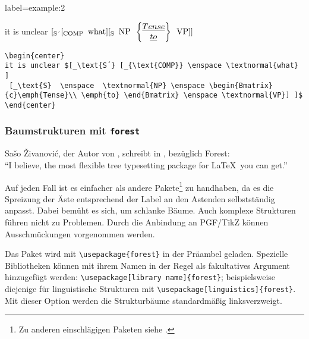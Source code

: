 \begin{lfgwprint}{label={example:2}}
\begin{center}
it is unclear $[_\text{S´} [_{\text{COMP}} \enspace \textnormal{what} ]
 [_\text{S}  \enspace  \textnormal{NP} \enspace \begin{Bmatrix} \emph{Tense}\\ \emph{to} \end{Bmatrix} \enspace \textnormal{VP}] ]$
\end{center}
\end{lfgwprint}

\lstset{frame=single}
\begin{lstlisting}
\begin{center}
it is unclear $[_\text{S´} [_{\text{COMP}} \enspace \textnormal{what} ]
 [_\text{S}  \enspace  \textnormal{NP} \enspace \begin{Bmatrix}{c}\emph{Tense}\\ \emph{to} \end{Bmatrix} \enspace \textnormal{VP}] ]$
\end{center}
\end{lstlisting}


\subsubsection{Baumstrukturen mit \texttt{forest}}

Sa\v{s}o \v{Z}ivanovi\'{c}, der Autor von , schreibt in
\cite[3]{zivanovic:forest},
bezüglich Forest: \\
"`I believe, the most flexible tree typesetting package for \LaTeX\ you can get."'

Auf jeden Fall ist es einfacher als andere Pakete\footnote{Zu anderen
einschlägigen Paketen siehe \cite{roemer:dtk2016}.} zu handhaben, da es die Spreizung
der Äste entsprechend der Label an den Astenden selbstständig anpasst. Dabei bemüht es sich,
um schlanke Bäume. Auch komplexe Strukturen führen nicht zu Problemen. Durch die Anbindung
an PGF/TikZ können Ausschmückungen vorgenommen werden.


Das Paket wird mit \verb|\usepackage{forest}| in der Präambel geladen. Spezielle Bibliotheken
können mit ihrem Namen in der Regel als fakultatives Argument hinzugefügt werden: 
\verb|\usepackage[library name]{forest}|; beispielsweise diejenige für linguistische Strukturen
mit \verb|\usepackage[linguistics]{forest}|. Mit dieser Option werden die Strukturbäume
standardmäßig linksverzweigt.

